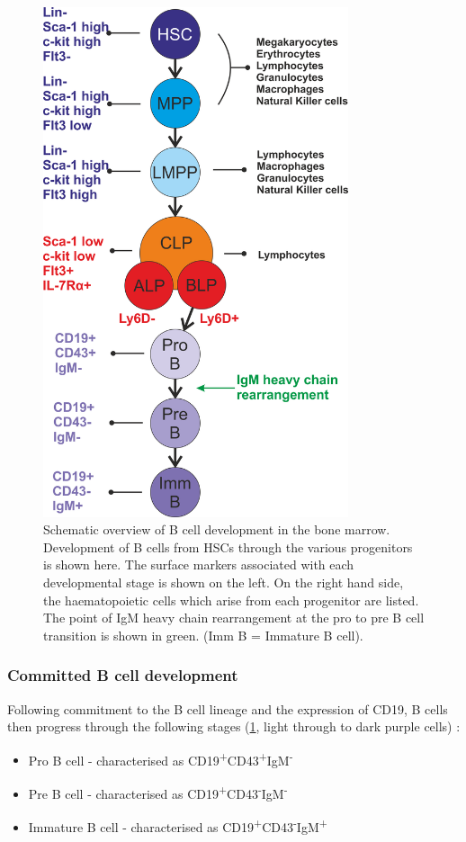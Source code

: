 \begin{figure}
\centering
\includegraphics[width=0.8\textwidth]{Figures/Bcelldevdiagram.png}
\caption{Schematic overview of B cell development in the bone marrow. Development of B cells from HSCs through the various progenitors is shown here. The surface markers associated with each developmental stage is shown on the left. On the right hand side, the haematopoietic cells which arise from each progenitor are listed.
The point of IgM heavy chain rearrangement at the pro to pre B cell transition is shown in green. (Imm B = Immature B cell).}
\label{Bcelldev}
\end{figure}


\subsubsection{Committed B cell development}
\label{subsubsec:committedBcelldevelopment}

Following commitment to the B cell lineage and the expression of CD19, B cells then progress through the following stages (\cref{Bcelldev}, light through to dark purple cells) \citep{Cambier2007}:
\begin{itemize}
\item Pro B cell - characterised as CD19\textsuperscript{+}CD43\textsuperscript{+}IgM\textsuperscript{-}
\item Pre B cell - characterised as CD19\textsuperscript{+}CD43\textsuperscript{-}IgM\textsuperscript{-}
\item Immature B cell - characterised as CD19\textsuperscript{+}CD43\textsuperscript{-}IgM\textsuperscript{+}
\end{itemize}

